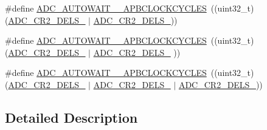 \begin{DoxyCompactItemize}
\item 
\#define \hyperlink{group___a_d_c___low_power_auto_wait_ga2e35389ff61bfd565254e96b250d3cbf}{A\-D\-C\-\_\-\-A\-U\-T\-O\-W\-A\-I\-T\-\_\-\_\-\-A\-P\-B\-C\-L\-O\-C\-K\-C\-Y\-C\-L\-E\-S}~((uint32\-\_\-t)(\hyperlink{group___peripheral___registers___bits___definition_ga81458a570d3d988d89673b426eebbedd}{A\-D\-C\-\_\-\-C\-R2\-\_\-\-D\-E\-L\-S\-\_}                  $\vert$ \hyperlink{group___peripheral___registers___bits___definition_ga2675f3571f7d741e309256904cac0e2e}{A\-D\-C\-\_\-\-C\-R2\-\_\-\-D\-E\-L\-S\-\_}))
\item 
\#define \hyperlink{group___a_d_c___low_power_auto_wait_gaa78cd6ab72c23f7e49423fef37a68919}{A\-D\-C\-\_\-\-A\-U\-T\-O\-W\-A\-I\-T\-\_\-\_\-\-A\-P\-B\-C\-L\-O\-C\-K\-C\-Y\-C\-L\-E\-S}~((uint32\-\_\-t)(\hyperlink{group___peripheral___registers___bits___definition_ga81458a570d3d988d89673b426eebbedd}{A\-D\-C\-\_\-\-C\-R2\-\_\-\-D\-E\-L\-S\-\_} $\vert$ \hyperlink{group___peripheral___registers___bits___definition_ga175b298af75da04802dbf0521e66a01c}{A\-D\-C\-\_\-\-C\-R2\-\_\-\-D\-E\-L\-S\-\_}                 ))
\item 
\#define \hyperlink{group___a_d_c___low_power_auto_wait_gaa18a79aa780ae1056c7a498604612678}{A\-D\-C\-\_\-\-A\-U\-T\-O\-W\-A\-I\-T\-\_\-\_\-\-A\-P\-B\-C\-L\-O\-C\-K\-C\-Y\-C\-L\-E\-S}~((uint32\-\_\-t)(\hyperlink{group___peripheral___registers___bits___definition_ga81458a570d3d988d89673b426eebbedd}{A\-D\-C\-\_\-\-C\-R2\-\_\-\-D\-E\-L\-S\-\_} $\vert$ \hyperlink{group___peripheral___registers___bits___definition_ga175b298af75da04802dbf0521e66a01c}{A\-D\-C\-\_\-\-C\-R2\-\_\-\-D\-E\-L\-S\-\_} $\vert$ \hyperlink{group___peripheral___registers___bits___definition_ga2675f3571f7d741e309256904cac0e2e}{A\-D\-C\-\_\-\-C\-R2\-\_\-\-D\-E\-L\-S\-\_}))
\end{DoxyCompactItemize}


\subsection{Detailed Description}


